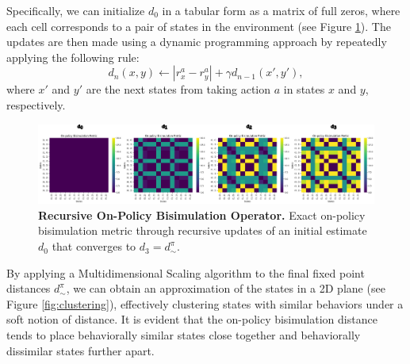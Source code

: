 Specifically, we can initialize \(d_0\) in a tabular form as a matrix of full zeros, where each cell corresponds to a pair of states in the environment (see Figure \ref{fig:iterative_process}). The updates are then made using a dynamic programming approach by repeatedly applying the following rule:
\begin{equation}
    d_n(x,y) \leftarrow |r_x^a - r_y^a| + \gamma d_{n-1}(x',y'),
\end{equation}
where \(x'\) and \(y'\) are the next states from taking action \(a\) in states \(x\) and \(y\), respectively.

\begin{figure}[h]
    \centering
    \includegraphics[width=1.\linewidth]{Figures/iterative process.jpg}
    \caption[Recursive On-policy Bisimulation Operator]{\textbf{Recursive On-Policy Bisimulation Operator.} Exact on-policy bisimulation metric through recursive updates of an initial estimate \(d_0\) that converges to \(d_3 = d_\sim^\pi\).}
    \label{fig:iterative_process}
\end{figure}

By applying a Multidimensional Scaling algorithm to the final fixed point distances \(d^\pi_\sim\), we can obtain an approximation of the states in a 2D plane (see Figure \ref{fig:clustering}), effectively clustering states with similar behaviors under a soft notion of distance. It is evident that the on-policy bisimulation distance tends to place behaviorally similar states close together and behaviorally dissimilar states further apart.

